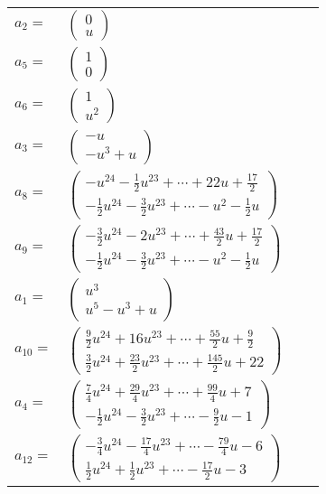 \documentclass[1p]{elsarticle_modified}
\theoremstyle{definition}
\begin{document}
\begin{tabular}{m{7pt} m{180pt} m{7pt} m{180pt} }
\flushright $a_{2}=$&$\begin{pmatrix}0\\u\end{pmatrix}$ \\
\flushright $a_{5}=$&$\begin{pmatrix}1\\0\end{pmatrix}$ \\
\flushright $a_{6}=$&$\begin{pmatrix}1\\u^2\end{pmatrix}$ \\
\flushright $a_{3}=$&$\begin{pmatrix}- u\\- u^3+u\end{pmatrix}$ \\
\flushright $a_{8}=$&$\begin{pmatrix}- u^{24}-\frac{1}{2} u^{23}+\cdots+22 u+\frac{17}{2}\\-\frac{1}{2} u^{24}-\frac{3}{2} u^{23}+\cdots- u^2-\frac{1}{2} u\end{pmatrix}$ \\
\flushright $a_{9}=$&$\begin{pmatrix}-\frac{3}{2} u^{24}-2 u^{23}+\cdots+\frac{43}{2} u+\frac{17}{2}\\-\frac{1}{2} u^{24}-\frac{3}{2} u^{23}+\cdots- u^2-\frac{1}{2} u\end{pmatrix}$ \\
\flushright $a_{1}=$&$\begin{pmatrix}u^3\\u^5- u^3+u\end{pmatrix}$ \\
\flushright $a_{10}=$&$\begin{pmatrix}\frac{9}{2} u^{24}+16 u^{23}+\cdots+\frac{55}{2} u+\frac{9}{2}\\\frac{3}{2} u^{24}+\frac{23}{2} u^{23}+\cdots+\frac{145}{2} u+22\end{pmatrix}$ \\
\flushright $a_{4}=$&$\begin{pmatrix}\frac{7}{4} u^{24}+\frac{29}{4} u^{23}+\cdots+\frac{99}{4} u+7\\-\frac{1}{2} u^{24}-\frac{3}{2} u^{23}+\cdots-\frac{9}{2} u-1\end{pmatrix}$ \\
\flushright $a_{12}=$&$\begin{pmatrix}-\frac{3}{4} u^{24}-\frac{17}{4} u^{23}+\cdots-\frac{79}{4} u-6\\\frac{1}{2} u^{24}+\frac{1}{2} u^{23}+\cdots-\frac{17}{2} u-3\end{pmatrix}$ \\

\end{tabular}
\end{document}

